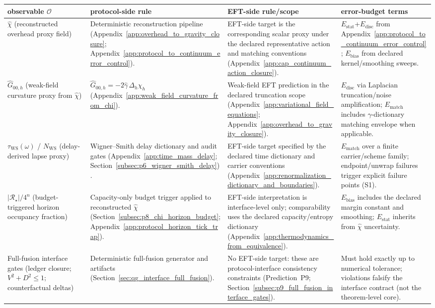 \begin{center}
\scriptsize
\setlength{\tabcolsep}{6pt}
\renewcommand{\arraystretch}{1.15}
\begin{tabular}{p{} p{} p{} p{}}
\toprule
observable $\mathcal{O}$ & protocol-side rule & EFT-side rule/scope & error-budget terms \\
\midrule
$\widehat\chi$ (reconstructed overhead proxy field) & Deterministic reconstruction pipeline (Appendix~\ref{app:overhead_to_gravity_closure}; Appendix~\ref{app:protocol_to_continuum_error_control}). & EFT-side target is the corresponding scalar proxy under the declared representative action and matching conventions (Appendix~\ref{app:cap_continuum_action_closure}). & $E_{\mathrm{stat}}$+$E_{\mathrm{disc}}$ from Appendix~\ref{app:protocol_to_continuum_error_control}; $E_{\mathrm{bias}}$ from declared kernel/smoothing sweeps. \\
$\widehat G_{00,h}$ (weak-field curvature proxy from $\widehat\chi$) & $\widehat G_{00,h}=-2\widehat\gamma\,\Delta_h\widehat\chi_h$ (Appendix~\ref{app:weak_field_curvature_from_chi}). & Weak-field EFT prediction in the declared truncation scope (Appendix~\ref{app:variational_field_equations}; Appendix~\ref{app:overhead_to_gravity_closure}). & $E_{\mathrm{disc}}$ via Laplacian truncation/noise amplification; $E_{\mathrm{match}}$ includes $\gamma$-dictionary matching envelope when applicable. \\
$\tau_{\mathrm{WS}}(\omega)$ / $N_{\mathrm{WS}}$ (delay-derived lapse proxy) & Wigner--Smith delay dictionary and audit gates (Appendix~\ref{app:time_mass_delay}; Section~\ref{subsec:p6_wigner_smith_delay}). & EFT-side target specified by the declared time dictionary and carrier conventions (Appendix~\ref{app:renormalization_dictionary_and_boundaries}). & $E_{\mathrm{match}}$ over a finite carrier/scheme family; endpoint/unwrap failures trigger explicit failure points (S1). \\
$|\mathcal{R}_\star|/4^n$ (budget-triggered horizon occupancy fraction) & Capacity-only budget trigger applied to reconstructed $\widehat\chi$ (Section~\ref{subsec:p8_chi_horizon_budget}; Appendix~\ref{app:protocol_horizon_tick_trap}). & EFT-side interpretation is interface-level only; comparability uses the declared capacity/entropy dictionary (Appendix~\ref{app:thermodynamics_from_equivalence}). & $E_{\mathrm{bias}}$ includes the declared margin constant and smoothing; $E_{\mathrm{stat}}$ inherits from $\widehat\chi$ uncertainty. \\
Full-fusion interface gates (ledger closure; $V^2+D^2\le 1$; counterfactual deltas) & Deterministic full-fusion generator and artifacts (Section~\ref{sec:qg_interface_full_fusion}). & No EFT-side target: these are protocol-interface consistency constraints (Prediction~P9; Section~\ref{subsec:p9_full_fusion_interface_gates}). & Must hold exactly up to numerical tolerance; violations falsify the interface contract (not the theorem-level core). \\
\bottomrule
\end{tabular}
\end{center}